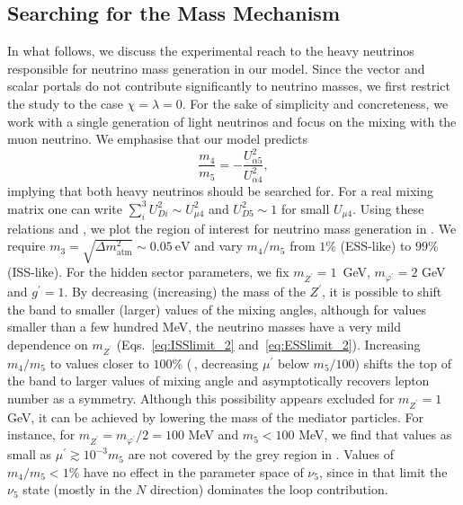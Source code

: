 \subsection{Searching for the Mass Mechanism} \label{sec:pure_nu_mixing}

In what follows, we discuss the experimental reach to the heavy neutrinos responsible for neutrino mass generation in our model. Since the vector and scalar portals do not contribute significantly to neutrino masses, we first restrict the study to the case $\chi=\lambda=0$. For the sake of simplicity and concreteness, we work with a single generation of light neutrinos and focus on the mixing with the muon neutrino. We emphasise that our model predicts
%
\begin{equation}
    \frac{m_4}{m_5} = - \frac{U_{\alpha 5}^2}{U_{\alpha 4}^2},
\end{equation}
%
implying that both heavy neutrinos should be searched for.
%
For a real mixing matrix one can write $\sum_i^3 U_{D i}^{2} \sim U_{\mu 4}^{2}$ and $U_{D 5}^{2} \sim 1$ for small $U_{\mu 4}$. Using these relations and , we plot the region of interest for neutrino mass generation in . We require $m_3 = 
\sqrt{\Delta m^2_{\text{atm}}} \sim 0.05~\text{eV}$ and vary $m_4/m_5$ from $1\%$ (ESS-like) to $99\%$ (ISS-like). For the hidden sector parameters, we fix $m_{Z^\prime}=1$~GeV, $m_{\varphi^\prime} = 2$ GeV and $g^\prime = 1$. By decreasing (increasing) the mass of the $Z^\prime$, it is possible to shift the band to smaller (larger) values of the mixing angles, although for values smaller than a few hundred MeV, the neutrino masses have a very mild dependence on $m_{Z^\prime}$ (Eqs.~\ref{eq:ISSlimit_2} and~\ref{eq:ESSlimit_2}). Increasing $m_4/m_5$ to values closer to $100\%$ (\ie\,, decreasing $\mu^\prime$ below $m_5/100$) shifts the top of the band to larger values of mixing angle and asymptotically recovers lepton number as a symmetry. Although this possibility appears excluded for $m_{Z^\prime} = 1$ GeV, it can be achieved by lowering the mass of the mediator particles. For instance, for $m_{Z^\prime} = m_{\varphi^\prime}/2 = 100$ MeV and $m_5 < 100$ MeV, we find that values as small as $\mu^\prime \gtrsim 10^{-3} m_5$ are not covered by the grey region in .
Values of $m_4/m_5 < 1\%$ have no effect in the parameter space of $\nu_5$, since in that limit the $\nu_5$ state (mostly in the $N$ direction) dominates the loop contribution.

